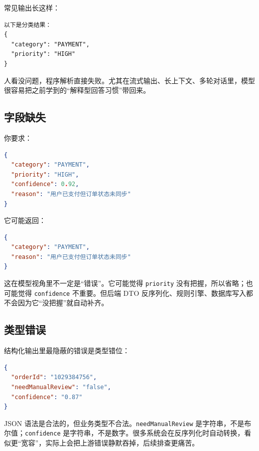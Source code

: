 \documentclass[10pt,a4paper]{ctexart}
\begin{document}
常见输出长这样：



\begin{lstlisting}
以下是分类结果：
{
  "category": "PAYMENT",
  "priority": "HIGH"
}
\end{lstlisting}



人看没问题，程序解析直接失败。尤其在流式输出、长上下文、多轮对话里，模型很容易把之前学到的“解释型回答习惯”带回来。



\subsection{字段缺失}


你要求：



\begin{lstlisting}[language=json]
{
  "category": "PAYMENT",
  "priority": "HIGH",
  "confidence": 0.92,
  "reason": "用户已支付但订单状态未同步"
}
\end{lstlisting}



它可能返回：



\begin{lstlisting}[language=json]
{
  "category": "PAYMENT",
  "reason": "用户已支付但订单状态未同步"
}
\end{lstlisting}



这在模型视角里不一定是“错误”。它可能觉得 \texttt{priority} 没有把握，所以省略；也可能觉得 \texttt{confidence} 不重要。但后端 DTO 反序列化、规则引擎、数据库写入都不会因为它“没把握”就自动补齐。



\subsection{类型错误}


结构化输出里最隐蔽的错误是类型错位：



\begin{lstlisting}[language=json]
{
  "orderId": "1029384756",
  "needManualReview": "false",
  "confidence": "0.87"
}
\end{lstlisting}



JSON 语法是合法的，但业务类型不合法。\texttt{needManualReview} 是字符串，不是布尔值；\texttt{confidence} 是字符串，不是数字。很多系统会在反序列化时自动转换，看似更“宽容”，实际上会把上游错误静默吞掉，后续排查更痛苦。
\end{document}
